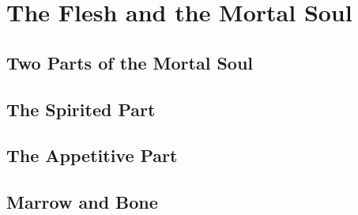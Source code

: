 
\chapter{The Flesh and the Mortal Soul} %
\label{cha:the_flesh_and_the_mortal_soul}



%
%
%

\section{Two Parts of the Mortal Soul} %
\label{sec:two_parts_of_the_mortal_soul}



\section{The Spirited Part} %
\label{sec:the_spirited_part}




\section{The Appetitive Part} %
\label{sec:the_appetitive_part}





\section{Marrow and Bone} %
\label{sec:marrow_and_bone}




